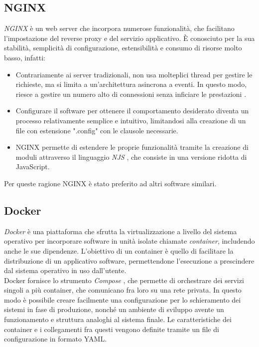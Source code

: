 \subsection{NGINX}
\textit{NGINX} \cite{nginx_bib} è un web server che incorpora numerose funzionalità, che facilitano l'impostazione del reverse proxy e del servizio applicativo. 
È conosciuto per la sua stabilità, semplicità di configurazione, estensibilità e consumo di risorse molto basso, infatti:
\begin{itemize}
    \item 
    Contrariamente ai server tradizionali,  
    non usa molteplici thread per gestire le richieste, ma si limita a un'architettura asincrona a eventi. 
    In questo modo, riesce a gestire un numero alto di connessioni senza inficiare le prestazioni \cite{nginx_doc}. 
    
    \item Configurare il software per ottenere il comportamento desiderato diventa un processo relativamente semplice e intuitivo, limitandosi
    alla creazione di un file con estensione ".config" con le clausole necessarie. 
    \item NGINX permette di estendere le proprie funzionalità tramite la creazione di moduli attraverso il linguaggio \textit{NJS} \cite{njs_doc}, 
    che consiste in una versione ridotta di JavaScript. 
\end{itemize}
Per queste ragione NGINX è stato preferito ad altri software similari.

\subsection{Docker}
\textit{Docker} \cite{docker_doc} è una piattaforma che sfrutta la virtualizzazione a livello del sistema operativo per incorporare software 
in unità isolate chiamate \textit{container}, includendo anche le sue dipendenze. L'obiettivo di un container è quello di 
facilitare la distribuzione di un applicativo software, permettendone l'esecuzione a prescindere dal sistema operativo 
in uso dall'utente. 
\\ Docker fornisce lo strumento \textit{Compose} \cite{docker_comp}, che permette di orchestrare dei servizi singoli a più container, 
che comunicano fra loro su una rete privata. In questo modo è possibile creare facilmente una configurazione per lo schieramento dei sistemi in fase di produzione, 
nonché un ambiente di sviluppo avente 
un funzionamento e struttura analoghi al sistema finale. Le caratteristiche dei container e i collegamenti fra questi
 vengono definite tramite un file di configurazione in formato YAML. 


